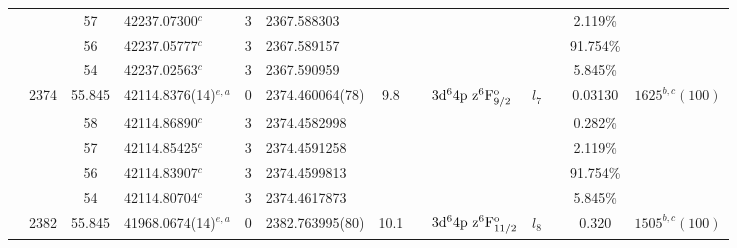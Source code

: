 \begin{table*}
\begin{center}
{\begin{tabular}{:l;l;c;l;c;l;c;l;l;c;c;c;c}
\rowstyle{\itshape}               &        & 57        & 42237.07300$^{c}$                & 3 &   2367.588303      &      & $                                        $ & $                                        $ & $      $ &              & 2.119\%   & $     ^{}     $\\
\rowstyle{\itshape}               &        & 56        & 42237.05777$^{c}$                & 3 &   2367.589157      &      & $                                        $ & $                                        $ & $      $ &              & 91.754\%  & $     ^{}     $\\
\rowstyle{\itshape}               &        & 54        & 42237.02563$^{c}$                & 3 &   2367.590959      &      & $                                        $ & $                                        $ & $      $ &              & 5.845\%   & $     ^{}     $\\
                                  & 2374   & 55.845    & 42114.8376(14)$^{e,a}$           & 0 &   2374.460064(78)  &  9.8 & $                                        $ & $3\rm{d}^64\rm{p~z}^6\rm{F}_{9/2}^{\rm o}$ & $l_{7} $ &              & 0.03130   & $ 1625^{b,c}(100)$\\
\rowstyle{\itshape}               &        & 58        & 42114.86890$^{c}$                & 3 &  2374.4582998      &      & $                                        $ & $                                        $ & $      $ &              & 0.282\%   & $     ^{}     $\\
\rowstyle{\itshape}               &        & 57        & 42114.85425$^{c}$                & 3 &  2374.4591258      &      & $                                        $ & $                                        $ & $      $ &              & 2.119\%   & $     ^{}     $\\
\rowstyle{\itshape}               &        & 56        & 42114.83907$^{c}$                & 3 &  2374.4599813      &      & $                                        $ & $                                        $ & $      $ &              & 91.754\%  & $     ^{}     $\\
\rowstyle{\itshape}               &        & 54        & 42114.80704$^{c}$                & 3 &  2374.4617873      &      & $                                        $ & $                                        $ & $      $ &              & 5.845\%   & $     ^{}     $\\
                                  & 2382   & 55.845    & 41968.0674(14)$^{e,a}$           & 0 &   2382.763995(80)  & 10.1 & $                                        $ & $3\rm{d}^64\rm{p~z}^6\rm{F}_{11/2}^{\rm o}$ & $l_{8} $ &              & 0.320     & $ 1505^{b,c}(100)$\\

\end{tabular}}
\end{center}
\end{table*}
